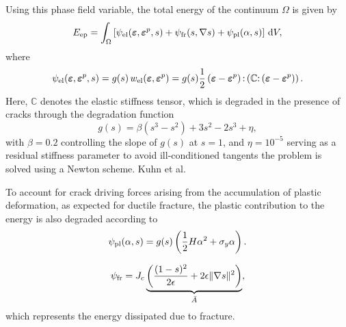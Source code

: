 \documentclass[pdflatex,sn-mathphys-num]{sn-jnl}%
\theoremstyle{thmstyleone}%
\theoremstyle{thmstyletwo}%
\theoremstyle{thmstylethree}%
\begin{document}
Using this phase field variable, the total energy of the continuum $\Omega$ is given by
\begin{equation}
    E_{\rm{ep}} = \int_{\Omega} \left[ 
    \psi_{\rm{el}}(\boldsymbol{\varepsilon},\boldsymbol{\varepsilon}^p,s) 
    + \psi_{\rm{fr}}(s,\nabla{s}) 
    + \psi_{\rm{pl}}(\alpha,s)
    \right] \, \mathrm{d}V,
\end{equation}
where
\begin{equation}
    \psi_{\rm{el}}(\boldsymbol{\varepsilon},\boldsymbol{\varepsilon}^p,s)
    = g(s)\,w_{\rm{el}}(\boldsymbol{\varepsilon},\boldsymbol{\varepsilon}^p)
    = g(s)\dfrac{1}{2}
    \left(\boldsymbol{\varepsilon}-\boldsymbol{\varepsilon}^p\right)
    {:}
    \left(\boldsymbol{\mathbb{C}}{:}
    \left(\boldsymbol{\varepsilon}-\boldsymbol{\varepsilon}^p\right)\right).
\end{equation}
Here, $\boldsymbol{\mathbb{C}}$ denotes the elastic stiffness tensor, which is degraded in the presence of cracks through the degradation function
\begin{equation}
    g(s) = \beta\left(s^3 - s^2\right) + 3s^2 - 2s^3 + \eta,
    \label{eq:deg_grad}
\end{equation}
with $\beta = 0.2$ controlling the slope of $g(s)$ at $s=1$, and $\eta = 10^{-5}$ serving as a residual stiffness parameter to avoid ill-conditioned tangents  the problem is solved using a Newton scheme.
Kuhn et al.~\cite{kuhn_phase_2016} 

To account for crack driving forces arising from the accumulation of plastic deformation, as expected for ductile fracture, the plastic contribution to the energy is also degraded according to
\begin{equation}
    \psi_{\rm{pl}}(\alpha,s) = g(s)\left(\dfrac{1}{2}H\alpha^2 + \sigma_y\alpha\right).
\end{equation}

\begin{equation}
    \psi_{\rm{fr}} = J_c
    \underbrace{\left(
    \dfrac{(1-s)^2}{2\epsilon} + 2\epsilon\|\nabla{s}\|^2
    \right)}_{\bar{A}},
\end{equation}
which represents the energy dissipated due to fracture. 
\end{document}
